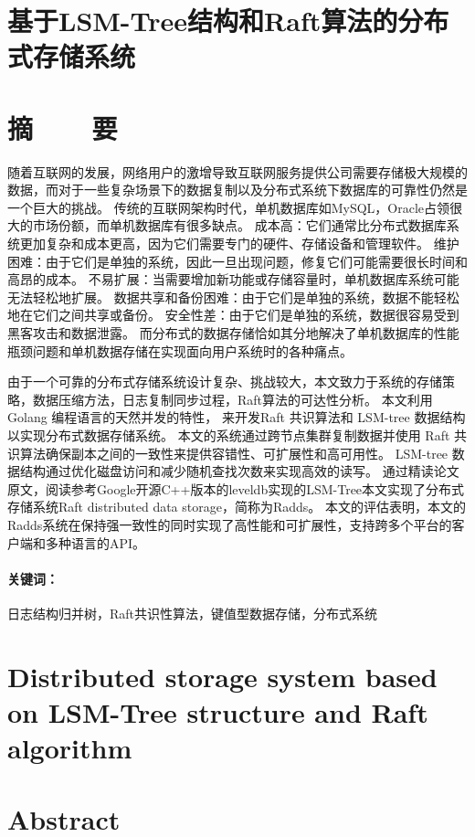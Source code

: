 \section*{基于LSM-Tree结构和Raft算法的分布式存储系统}
\section*{摘\ \ \ \ 要}

随着互联网的发展，网络用户的激增导致互联网服务提供公司需要存储极大规模的数据，而对于一些复杂场景下的数据复制以及分布式系统下数据库的可靠性仍然是一个巨大的挑战。
传统的互联网架构时代，单机数据库如MySQL，Oracle占领很大的市场份额，而单机数据库有很多缺点。
成本高：它们通常比分布式数据库系统更加复杂和成本更高，因为它们需要专门的硬件、存储设备和管理软件。
维护困难：由于它们是单独的系统，因此一旦出现问题，修复它们可能需要很长时间和高昂的成本。
不易扩展：当需要增加新功能或存储容量时，单机数据库系统可能无法轻松地扩展。
数据共享和备份困难：由于它们是单独的系统，数据不能轻松地在它们之间共享或备份。
安全性差：由于它们是单独的系统，数据很容易受到黑客攻击和数据泄露。
而分布式的数据存储恰如其分地解决了单机数据库的性能瓶颈问题和单机数据存储在实现面向用户系统时的各种痛点。


由于一个可靠的分布式存储系统设计复杂、挑战较大，本文致力于系统的存储策略，数据压缩方法，日志复制同步过程，Raft算法的可达性分析。
本文利用 Golang 编程语言的天然并发的特性， 来开发Raft 共识算法和 LSM-tree 数据结构以实现分布式数据存储系统。 
本文的系统通过跨节点集群复制数据并使用 Raft 共识算法确保副本之间的一致性来提供容错性、可扩展性和高可用性。 
LSM-tree 数据结构通过优化磁盘访问和减少随机查找次数来实现高效的读写。 
通过精读论文原文，阅读参考Google开源C++版本的leveldb实现的LSM-Tree本文实现了分布式存储系统Raft distributed data storage，简称为Radds。
本文的评估表明，本文的Radds系统在保持强一致性的同时实现了高性能和可扩展性，支持跨多个平台的客户端和多种语言的API。

\paragraph{关键词：} 日志结构归并树，Raft共识性算法，键值型数据存储，分布式系统

\clearpage


\section*{Distributed storage system based on LSM-Tree structure and Raft algorithm}

\section*{Abstract}

